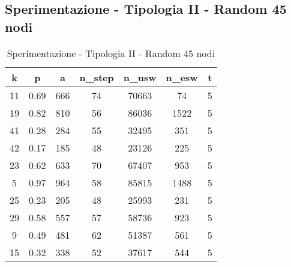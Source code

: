 \subsection{Sperimentazione - Tipologia II - Random 45 nodi}

\begin{table}[H]
\centering
\begin{tabular}{|c|c|c|c|c|c|c|}
\hline
\textbf{k} & \textbf{p} & \textbf{a} & \textbf{n\_step} & \textbf{n\_usw} & \textbf{n\_esw} & \textbf{t} \\ \hline
11 & 0.69 & 666 & 74 & 70663 & 74 & 5 \\ \hline
19 & 0.82 & 810 & 56 & 86036 & 1522 & 5 \\ \hline
41 & 0.28 & 284 & 55 & 32495 & 351 & 5 \\ \hline
42 & 0.17 & 185 & 48 & 23126 & 225 & 5 \\ \hline
23 & 0.62 & 633 & 70 & 67407 & 953 & 5 \\ \hline
5 & 0.97 & 964 & 58 & 85815 & 1488 & 5 \\ \hline
25 & 0.23 & 205 & 48 & 25993 & 231 & 5 \\ \hline
29 & 0.58 & 557 & 57 & 58736 & 923 & 5 \\ \hline
9 & 0.49 & 481 & 62 & 51387 & 561 & 5 \\ \hline
15 & 0.32 & 338 & 52 & 37617 & 544 & 5 \\ \hline
\end{tabular}
\caption{Sperimentazione - Tipologia II - Random 45 nodi}
\label{tab:sperimentazione-tipo1-45nodi}
\end{table}
